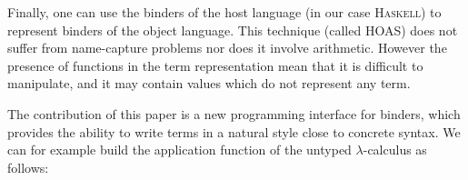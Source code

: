 \documentclass[9pt,authoryear]{sigplanconf}
\begin{document}
%
Finally, one can use the binders of the host language (in our case
    \textsc{Haskell}) to represent binders of the object language. This
    technique (called HOAS) does not suffer from name-capture problems
    nor does it involve arithmetic. However the presence of functions in
    the term representation mean that it is difficult to manipulate, and
    it may contain values which do not represent any term.%


%
The contribution of this paper is a new programming interface for
    binders, which provides the ability to write terms in a natural
    style close to concrete syntax. We can for example build the
    application function of the untyped $ \lambda $-calculus as follows{:}%


%
%


{\nopagebreak }
\end{document}
